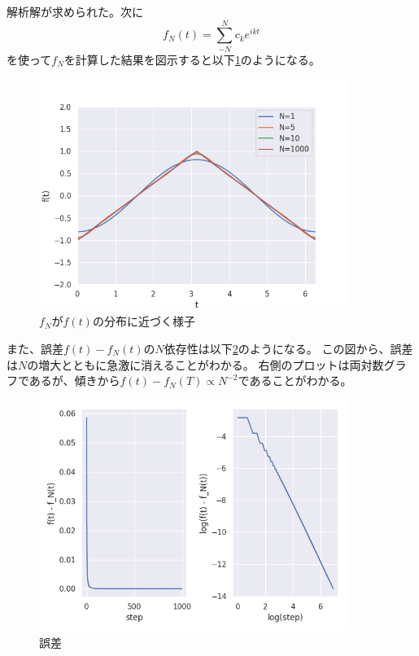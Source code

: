 \documentclass{jsarticle}
\begin{document}
解析解が求められた。次に
\begin{equation}
    f_N(t) = \sum^N_{-N} c_k e^{ikt}
\end{equation}
を使って$f_N$を計算した結果を図示すると以下\ref{f1}のようになる。
\begin{figure}[htbp]\label{f1}
    \includegraphics[clip,width=10.0cm]{./fourier_case1.png}
    \caption{$f_N$が$f(t)$の分布に近づく様子}
\end{figure}
また、誤差$f(t) - f_N(t)$の$N$依存性は以下\ref{f2}のようになる。
この図から、誤差は$N$の増大とともに急激に消えることがわかる。
右側のプロットは両対数グラフであるが、傾きから$f(t) - f_N(T) \propto N^{-2}$であることがわかる。
\begin{figure}[htbp]\label{f2}
    \includegraphics[clip,width=10.0cm]{./fourier_error_case1.png}
    \caption{誤差}
\end{figure}


\end{document}
